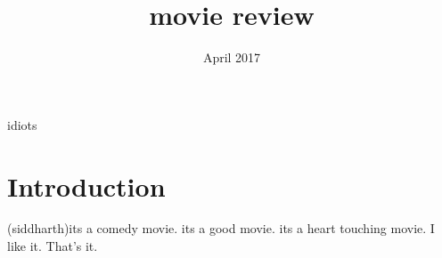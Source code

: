 \documentclass{article}
\title{movie review}
\date{April 2017}
\begin{document}
 idiots
\section{Introduction}
(siddharth)its a comedy movie. its a good movie. its a heart touching movie. I like it. That's it.  
\end{document}
